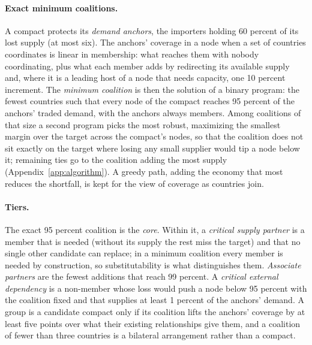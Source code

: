 \paragraph{Exact minimum coalitions.} A compact protects its \emph{demand anchors}, the importers
holding 60 percent of its lost supply (at most six). The anchors' coverage in a node when a set of
countries coordinates is linear in membership: what reaches them with nobody coordinating, plus what
each member adds by redirecting its available supply and, where it is a leading host of a node that
needs capacity, one 10 percent increment. The \emph{minimum coalition} is then the solution of a binary
program: the fewest countries such that every node of the compact reaches 95 percent of the anchors'
traded demand, with the anchors always members. Among coalitions of that size a second program picks
the most robust, maximizing the smallest margin over the target across the compact's nodes, so that the
coalition does not sit exactly on the target where losing any small supplier would tip a node below it;
remaining ties go to the coalition adding the most supply (Appendix~\ref{app:algorithm}). A greedy path,
adding the economy that most reduces the shortfall, is kept for the view of coverage as countries
join.

\paragraph{Tiers.} The exact 95 percent coalition is the \emph{core}. Within it, a \emph{critical supply
partner} is a member that is needed (without its supply the rest miss the target) and that no single
other candidate can replace; in a minimum coalition every member is needed by construction, so
substitutability is what distinguishes them. \emph{Associate partners} are the fewest additions that
reach 99 percent. A \emph{critical external dependency} is a non-member whose loss would push a node
below 95 percent with the coalition fixed and that supplies at least 1 percent of the anchors' demand.
A group is a candidate compact only if its coalition lifts the anchors' coverage by at least five
points over what their existing relationships give them, and a coalition of fewer than three countries
is a bilateral arrangement rather than a compact.

